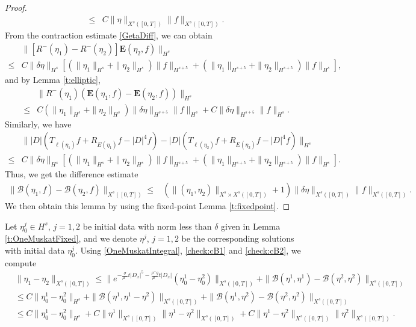 \documentclass[12pt]{amsart}
\theoremstyle{definition}
\numberwithin{equation}{section}
\newcommand{\f}{\frac}
\begin{document}
\begin{proof}
\begin{equation}
\begin{aligned}
\leq&C\|\eta\|_{X^s([0,T])}\|f\|_{X^s([0,T])}.
\end{aligned}  
\end{equation}
From the contraction estimate \eqref{GetaDiff},
we can obtain
\begin{align*}
&\|[R^-(\eta_1)-R^-(\eta_2)]\mathbf{E}(\eta_2,f) \|_{H^s}\\
\leq& C\|\delta\eta\|_{H^s}[(\|\eta_1\|_{H^s}+\|\eta_2\|_{H^s})\|f\|_{H^{s+5}}+(\|\eta_1\|_{H^{s+5}}+\|\eta_2\|_{H^{s+5}})\|f\|_{H^{s}}],
\end{align*}
and by Lemma \ref{t:elliptic},
\begin{align*}
&\|R^-(\eta_1)(\mathbf{E}(\eta_1,f) -\mathbf{E}(\eta_2,f))\|_{H^s}\\
\leq& C(\|\eta_1\|_{H^s}+\|\eta_2\|_{H^s})\|\delta \eta\|_{H^{s+5}}\|f\|_{H^s}+C\|\delta\eta\|_{H^{s+5}}\|f\|_{H^{s}}.
\end{align*}
Similarly, we have
\begin{align*}
&\||D|(T_{\ell(\eta_1)}f+R_{E(\eta_1)}f - |D|^4f)-|D|(T_{\ell(\eta_2)}f+R_{E(\eta_2)}f - |D|^4f)\|_{H^s} \\
\leq& C\|\delta\eta\|_{H^s}[(\|\eta_1\|_{H^s}+\|\eta_2\|_{H^s})\|f\|_{H^{s+5}}+(\|\eta_1\|_{H^{s+5}}+\|\eta_2\|_{H^{s+5}})\|f\|_{H^{s}}].
\end{align*}
Thus, we get the difference estimate
\begin{equation} \label{check:cB2}
\begin{aligned}
\|\mathcal{B}(\eta_1,f)-\mathcal{B}(\eta_2,f)\|_{X^s([0,T])}\leq&(\|(\eta_1,\eta_2)\|_{X^s\times X^s([0,T])}+1)\|\delta \eta\|_{X^s([0,T])}\|f\|_{X^s([0,T])}.
\end{aligned}
\end{equation}
We then obtain this lemma by using the fixed-point Lemma \ref{t:fixedpoint}.
\end{proof}
Let $\eta_0^j\in H^s$, $j=1, 2$ be initial data with norm less than $\delta$ given in Lemma \ref{t:OneMuskatFixed}, and we denote $\eta^j$, $j = 1,2$ be the corresponding solutions with initial data $\eta_0^j$.
Using \eqref{OneMuskatIntegral}, \eqref{check:cB1} and \eqref{check:cB2}, we compute
\begin{align*}
 &\|\eta_1 - \eta_2\|_{X^s([0,T])} \leq \big\|e^{- \f{\sigma}{\mu^-}t|D_x|^5 - \frac{\rho^- g}{\mu^-}t|D_x|} (\eta_0^1 - \eta_0^2) \big\|_{X^s([0,T])} +  \|\mathcal{B}(\eta^1, \eta^1) - \mathcal{B}(\eta^2, \eta^2) \|_{X^s([0,T])} \\
 &\leq C\|\eta_0^1 - \eta_0^2 \|_{H^s} + \|\mathcal{B}(\eta^1, \eta^1- \eta^2) \|_{X^s([0,T])} +  \|\mathcal{B}(\eta^1, \eta^2) - \mathcal{B}(\eta^2, \eta^2) \|_{X^s([0,T])} \\
 &\leq C\|\eta_0^1 - \eta_0^2 \|_{H^s}   +C\|\eta^1\|_{X^s([0, T])}\| \eta^1-\eta^2\|_{X^s([0, T])}+C\| \eta^1-\eta^2\|_{X^s([0, T])}\| \eta^2\|_{X^s([0, T])}.
\end{align*}
\end{document}
